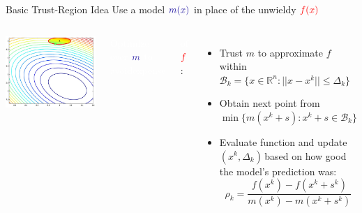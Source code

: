 \documentclass[handout,aspectratio=54]{beamer}
\numberwithin{theorem}{section}
\begin{document}
\begin{frame}{Basic Trust-Region Idea}
Use a model $\textcolor{blue}{m(x)}$ in place of the unwieldy $\textcolor{red}{f(x)}$

\begin{columns}
\includegraphics[width=\textwidth]{fig/22-1.jpg}

\colorbox[rgb]{0.5,0.6,0.7}{\textcolor{white}{Optimize over }$\textcolor{blue}{m}$ \textcolor{white}{to avoidexpense }}

\colorbox[rgb]{0.5,0.6,0.7}{\textcolor{white}{of} $\textcolor{red}{f}$:}

\begin{itemize}
\item Trust $m$ to approximate $f$ within $ \mathcal{B}_k=\{x\in\mathbb{R}^n:||x-x^k||\le \Delta_k\}$
\item Obtain next point from $\min\{m(x^k+s):x^k+s\in \mathcal{B}_k\}$
\item Evaluate function and update $(x^k, \Delta_k)$\,based on how good the model's prediction was:
\begin{equation*}
\rho_k=\frac{f(x^k)-f(x^k+s^k)}{m(x^k)-m(x^k+s^k)}
\end{equation*}
\end{itemize}

\footnotesize{}
\end{columns}
\end{frame}
\end{document}
